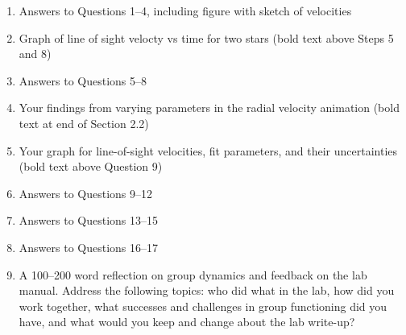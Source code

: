 \begin{enumerate}
	\item Answers to Questions 1--4, including figure with sketch of velocities
	\item Graph of line of sight velocty vs time for two stars (bold text above Steps 5 and 8)
	\item Answers to Questions 5--8
	\item Your findings from varying parameters in the radial velocity animation (bold text at end of Section 2.2)
	\item Your graph for line-of-sight velocities, fit parameters, and their uncertainties (bold text above Question 9)
	\item Answers to Questions 9--12
	\item Answers to Questions 13--15
	\item Answers to Questions 16--17
	\item A 100--200 word reflection on group dynamics and feedback on the lab manual. Address the following topics: who did what in the lab, how did you work together, what successes and challenges in group functioning did you have, and what would you keep and change about the lab write-up?
\end{enumerate}